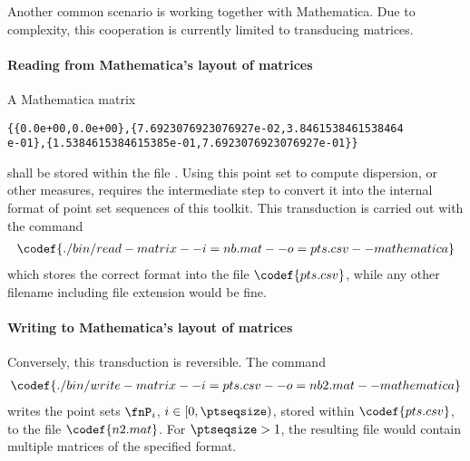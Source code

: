 %
Another common scenario is working together with Mathematica. Due to complexity, this cooperation is currently limited to transducing matrices.

\paragraph{Reading from Mathematica's layout of matrices}

A Mathematica matrix
\begin{verbatim}
{{0.0e+00,0.0e+00},{7.6923076923076927e-02,3.8461538461538464
e-01},{1.5384615384615385e-01,7.6923076923076927e-01}}
\end{verbatim}
shall be stored within the file . Using this point set to compute dispersion, or other measures, requires the intermediate step to convert it into the internal format of point set sequences of this toolkit. This transduction is carried out with the command
\begin{align*}
  \codef{./bin/read-matrix --i=nb.mat --o=pts.csv --mathematica}
\end{align*}
which stores the correct format into the file $\codef{pts.csv}$, while any other filename including file extension would be fine.


\paragraph{Writing to Mathematica's layout of matrices}

Conversely, this transduction is reversible. The command
\begin{align*}
  \codef{./bin/write-matrix --i=pts.csv --o=nb2.mat --mathematica}
\end{align*}
writes the point sets $\fnP_i$, $i\in[0,\ptseqsize)$, stored within $\codef{pts.csv}$, to the file $\codef{n2.mat}$. For $\ptseqsize>1$, the resulting file would contain multiple matrices of the specified format.
